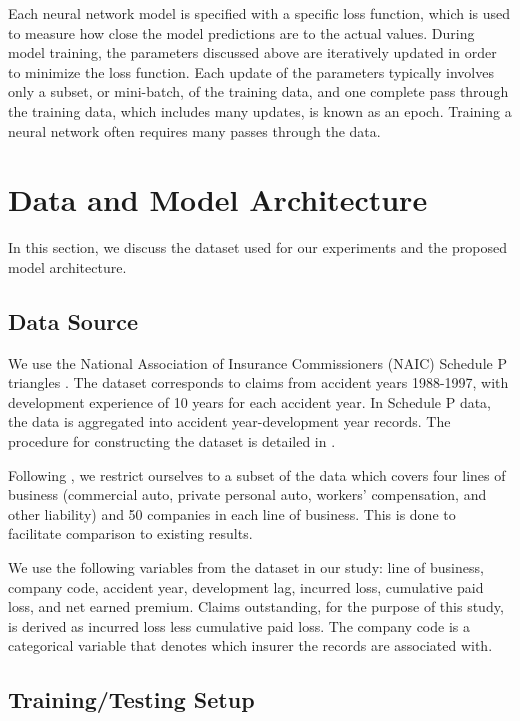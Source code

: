 \documentclass[risks,article,submit,moreauthors,pdftex]{mdpi}
\begin{document}
Each neural network model is specified with a specific loss function, which is used to measure how close the model predictions are to the actual values. During model training, the parameters discussed above are iteratively updated in order to minimize the loss function. Each update of the parameters typically involves only a subset, or mini-batch, of the training data, and one complete pass through the training data, which includes many updates, is known as an epoch. Training a neural network often requires many passes through the data.

\hypertarget{data-arch}{%
\section{Data and Model Architecture}\label{data-arch}}

In this section, we discuss the dataset used for our experiments and the proposed model architecture.

\hypertarget{data-source}{%
\subsection{Data Source}\label{data-source}}

We use the National Association of Insurance Commissioners (NAIC) Schedule P triangles \citep{meyers2011loss}. The dataset corresponds to claims from accident years 1988-1997, with development experience of 10 years for each accident year. In Schedule P data, the data is aggregated into accident year-development year records. The procedure for constructing the dataset is detailed in \citet{meyers2015stochastic}.

Following \citet{meyers2015stochastic}, we restrict ourselves to a subset of the data which covers four lines of business (commercial auto, private personal auto, workers' compensation, and other liability) and 50 companies in each line of business. This is done to facilitate comparison to existing results.

We use the following variables from the dataset in our study: line of business, company code, accident year, development lag, incurred loss, cumulative paid loss, and net earned premium. Claims outstanding, for the purpose of this study, is derived as incurred loss less cumulative paid loss. The company code is a categorical variable that denotes which insurer the records are associated with.

\hypertarget{trainingtesting-setup}{%
\subsection{Training/Testing Setup}\label{trainingtesting-setup}}
\end{document}
